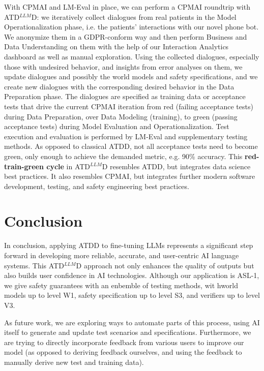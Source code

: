 \documentclass[twocolumn]{article}
\newcommand{\ATDLLMD}{ATD$^{LLM}$D}%
\begin{document}
With CPMAI and LM-Eval in place, we can perform a CPMAI roundtrip with \ATDLLMD{}:
we iteratively collect dialogues from real patients in the Model Operationalization phase,
i.e. the patients’ interactions with our novel phone bot.
We anonymize them in a GDPR-conform way and then perform Business and Data Understanding on them
with the help of our Interaction Analytics dashboard as well as manual exploration.
Using the collected dialogues, especially those with undesired behavior, and insights from error analyses on them,
we update dialogues and possibly the world models and safety specifications,
and we create new dialogues with the corresponding desired behavior in the Data Preparation phase.
The dialogues are specified as training data or acceptance tests that drive the current CPMAI iteration
from red (failing acceptance tests) during Data Preparation,
over Data Modeling (training), to green (passing acceptance tests) during Model Evaluation and Operationalization.
Test execution and evaluation is performed by LM-Eval and supplementary testing methods.
As opposed to classical ATDD, not all acceptance tests need to become green, only enough to achieve the demanded metric, e.g. 90\% accuracy.
This {\bfseries red-train-green cycle} in \ATDLLMD{} resembles ATDD, but integrates data science best practices.
It also resembles CPMAI, but integrates further modern software development, testing, and safety engineering best practices.


\section{Conclusion}

In conclusion, applying ATDD to fine-tuning LLMs represents a significant step forward in developing more reliable, accurate, and user-centric AI language systems. This \ATDLLMD{} approach not only enhances the quality of outputs but also builds user confidence in AI technologies.
Although our application is ASL-1, we give safety guarantees with an enbemble of testing methods, wit hworld models up to level W1, safety specification up to level S3, and verifiers up to level V3.

As future work, we are exploring ways to automate parts of this process, using AI itself to generate and update test scenarios and specifications.
Furthermore, we are trying to directly incorporate feedback from various users to improve our model (as opposed to deriving feedback ourselves, and using the feedback to manually derive new test and training data).
\end{document}
